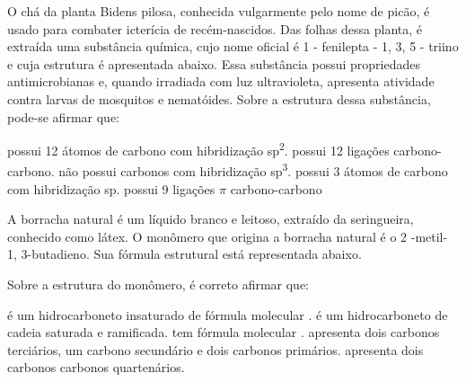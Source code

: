 \documentclass[10pt]{scrartcl}
\begin{document}
\begin{exercise}[points=1]
O chá da planta Bidens pilosa, conhecida vulgarmente pelo nome de picão, é usado para combater icterícia de recém-nascidos. Das folhas dessa planta, é extraída uma substância química, cujo nome oficial é 1 - fenilepta - 1, 3, 5 - triino e cuja estrutura é apresentada abaixo. Essa substância possui propriedades antimicrobianas e, quando irradiada com luz ultravioleta, apresenta atividade contra larvas de mosquitos e nematóides.
Sobre a estrutura dessa substância, pode-se afirmar que:


\begin{choice}
\choice possui 12 átomos de carbono com hibridização sp\textsuperscript{2}.
\choice possui 12 ligações  carbono-carbono.
\choice não possui carbonos com hibridização sp\textsuperscript{3}.
\choice possui 3 átomos de carbono com hibridização sp.
\choice possui 9 ligações \(\pi\) carbono-carbono
\end{choice}
\end{exercise}
\begin{solution}

\end{solution}





\begin{exercise}[points=1]
A borracha natural é um líquido branco e leitoso, extraído da seringueira, conhecido como látex. O monômero que origina a borracha natural é o 2 -metil- 1, 3-butadieno. Sua fórmula estrutural está representada abaixo.


Sobre a estrutura do monômero, é correto afirmar que:
\begin{choice}
\choice é um hidrocarboneto insaturado de fórmula molecular .
\choice é um hidrocarboneto de cadeia saturada e ramificada.
\choice tem fórmula molecular .
\choice apresenta dois carbonos terciários, um carbono secundário e dois carbonos primários.
\choice apresenta dois carbonos carbonos quartenários.
\end{choice}
\end{exercise}
\begin{solution}

\end{solution}
\end{document}
